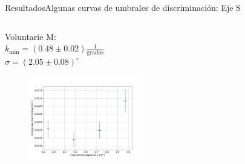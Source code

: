 \documentclass[
    11pt, %
    aspectratio=169, %
]{beamer}
\begin{document}
\begin{frame}{Resultados}{Algunas curvas de umbrales de discriminación: Eje S}
\begin{columns}[c]
    
  		\begin{column}{0.50\textwidth} %
            \begin{center}
                Voluntarie M: \\ $k_{\text{min}} = (0.48 \pm 0.02)\frac{1}{\text{grados}}$ \\ $\sigma = (2.05 \pm 0.08)^\circ$
            \end{center}
                 \begin{figure}[h!]
                    \centering
                    \includegraphics[angle=0, width=5cm]{Images/resultados/martina_s.png}
                \end{figure}
		\end{column}		
	\end{columns}

\end{frame}
\end{document}
